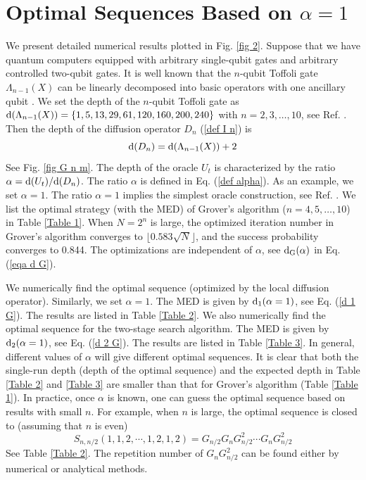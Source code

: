 \documentclass[%
 twocolumn,
 10pt,
 superscriptaddress,
 longbibliography,
 amsmath,amssymb,
 aps,
 pra,
floatfix,
]{revtex4-1}
\begin{document}
\section{\label{Appendix opt examples} Optimal Sequences Based on \texorpdfstring{$\alpha=1$}{Lg}}



We present detailed numerical results plotted in Fig. \ref{fig 2}. Suppose that we have quantum computers equipped with arbitrary single-qubit gates and arbitrary controlled two-qubit gates. It is well known that the $n$-qubit Toffoli gate $\Lambda_{n-1}(X)$ can be linearly decomposed into basic operators with one ancillary qubit \cite{BBCDMSSSW95}. We set the depth of the $n$-qubit Toffoli gate as $\text d(\Lambda_{n-1}(X))=\{1,5,13,29,61,120,160,200,240\}$ with $n=2,3,\ldots,10$, see Ref. \cite{BBCDMSSSW95}. Then the depth of the diffusion operator $D_n$ (\ref{def I n}) is
\begin{equation}
    \text d(D_n)=\text d(\Lambda_{n-1}(X))+2
\end{equation}
See Fig. \ref{fig G n m}. The depth of the oracle $U_t$ is characterized by the ratio $\alpha=\text d(U_t)/\text d(D_n)$. The ratio $\alpha$ is defined in Eq. (\ref{def alpha}). As an example, we set $\alpha=1$. The ratio $\alpha=1$ implies the simplest oracle construction, see Ref. \cite{FMLLDM17}. We list the optimal strategy (with the MED) of Grover's algorithm ($n=4,5,\ldots,10$) in Table \ref{Table 1}. When $N=2^n$ is large, the optimized iteration number in Grover's algorithm converges to $\lfloor 0.583\sqrt N\rfloor$, and the success probability converges to 0.844. The optimizations are independent of $\alpha$, see $\text d_\text{G}(\alpha)$ in Eq. (\ref{eqa d G}).

We numerically find the optimal sequence (optimized by the local diffusion operator). Similarly, we set $\alpha=1$. The MED is given by $\text d_1(\alpha=1)$, see Eq. (\ref{d 1 G}). The results are listed in Table \ref{Table 2}. We also numerically find the optimal sequence for the two-stage search algorithm. The MED is given by $\text d_2(\alpha=1)$, see Eq. (\ref{d 2 G}). The results are listed in Table \ref{Table 3}. In general, different values of $\alpha$ will give different optimal sequences. It is clear that both the single-run depth (depth of the optimal sequence) and the expected depth in Table \ref{Table 2} and \ref{Table 3} are smaller than that for Grover's algorithm (Table \ref{Table 1}). In practice, once $\alpha$ is known, one can guess the optimal sequence based on results with small $n$. For example, when $n$ is large, the optimal sequence is closed to (assuming that $n$ is even)
\begin{equation}
    S_{n,n/2}(1,1,2,\cdots,1,2,1,2) = G_{n/2}G_{n}G^2_{n/2}\cdots G_{n}G^2_{n/2}
\end{equation}
See Table \ref{Table 2}. The repetition number of $G_{n}G^2_{n/2}$ can be found either by numerical or analytical methods. 
\end{document}
